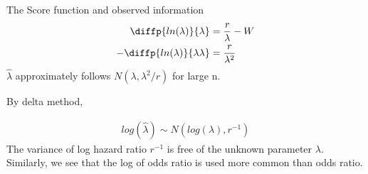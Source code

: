 \documentclass[11pt]{article} %
\begin{document}
The Score function and observed information
\begin{align*}
	\diffp{ln(\lambda)}{\lambda} & = \frac{r}{\lambda} -W\\
	-\diffp{ln(\lambda)}{{\lambda}{\lambda}} &= \frac{r}{\lambda^2}
\end{align*}
$\hat\lambda$ approximately follows $N(\lambda, \lambda^2/r)$ for large n.

By delta method,

\begin{align*}
	log(\hat\lambda) \sim N(log(\lambda), r^{-1})
\end{align*}
The variance of log hazard ratio $r^{-1}$ is free of the unknown parameter $\lambda$. Similarly, we see that the log of odds ratio is used more common than odds ratio. 
\end{document}

